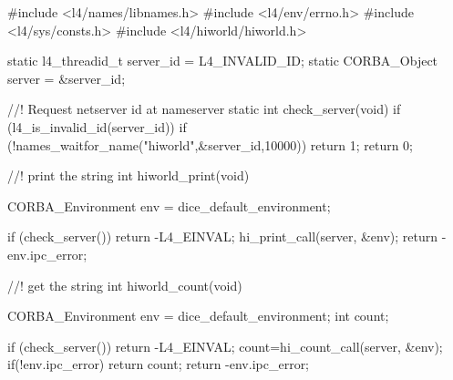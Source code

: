 #include <l4/names/libnames.h>
#include <l4/env/errno.h>
#include <l4/sys/consts.h>
#include <l4/hiworld/hiworld.h>

static l4_threadid_t server_id = L4_INVALID_ID;
static CORBA_Object server = &server_id;
            
//! Request netserver id at nameserver
static int check_server(void){
    if (l4_is_invalid_id(server_id)){
        if (!names_waitfor_name("hiworld",&server_id,10000)) return 1;
    }
    return 0;
}

//! print the string
int hiworld_print(void){
    CORBA_Environment env = dice_default_environment;

    if (check_server()) return -L4_EINVAL;
    hi_print_call(server, &env);
    return -env.ipc_error;
}
//! get the string
int hiworld_count(void){
    CORBA_Environment env = dice_default_environment;
    int count;

    if (check_server()) return -L4_EINVAL;
    count=hi_count_call(server, &env);
    if(!env.ipc_error) return count;
    return -env.ipc_error;
}
